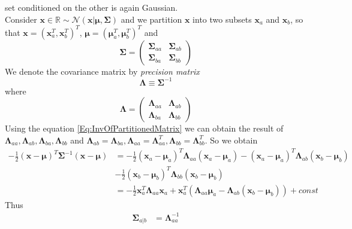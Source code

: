 \documentclass[12pt, a4paper]{article}
\newcommand{\R}{\mathbb{R}}
\begin{document}
\begin{itemize}
        set conditioned on the other is again Gaussian.\\
        Consider $\bm{x}\in\R \sim \mathcal{N}(\bm{x}|\bm{\mu},\bm{\Sigma})$ and we partition $\bm{x}$
        into two subsets $\bm{x}_a$ and $\bm{x}_b$, so that $\bm{x}=(\bm{x}_a^T, \bm{x}_b^T)^T$, 
        $\bm{\mu}=(\bm{\mu}_a^T,\bm{\mu}_b^T)^T$ and 
        \begin{equation*}
            \bm{\Sigma}=\begin{pmatrix}
                \bm{\Sigma}_{aa} & \bm{\Sigma}_{ab}\\
                \bm{\Sigma}_{ba} & \bm{\Sigma}_{bb}
            \end{pmatrix}
        \end{equation*}
        We denote the covariance matrix by \textit{precision matrix}
        \begin{equation*}
            \bm{\Lambda} \equiv\bm{\Sigma}^{-1}
        \end{equation*}
        where 
        \begin{equation*}
            \bm{\Lambda}=\begin{pmatrix}
                \bm{\Lambda}_{aa} & \bm{\Lambda}_{ab}\\
                \bm{\Lambda}_{ba} & \bm{\Lambda}_{bb}
            \end{pmatrix}
        \end{equation*}
        Using the equation \ref{Eq:InvOfPartitionedMatrix} we can obtain the result of $\bm{\Lambda}_{aa},
        \bm{\Lambda}_{ab}, \bm{\Lambda}_{ba}, \bm{\Lambda}_{bb}$ and $\bm{\Lambda}_{ab}=\bm{\Lambda}_{ba},
        \bm{\Lambda}_{aa}=\bm{\Lambda}_{aa}^T,\bm{\Lambda}_{bb}=\bm{\Lambda}_{bb}^T$.
         So we obtain
        \begin{align*}
            -\frac{1}{2}(\bm{x}-\bm{\mu})^T\bm{\Sigma}^{-1}(\bm{x}-\bm{\mu})&=-\frac{1}{2}
            (\bm{x}_a-\bm{\mu}_a)^T\bm{\Lambda}_{aa}(\bm{x}_a-\bm{\mu}_a)-
            (\bm{x}_a-\bm{\mu}_a)^T\bm{\Lambda}_{ab}(\bm{x}_b-\bm{\mu}_b)\\
            &-\frac{1}{2}(\bm{x}_b-\bm{\mu}_b)^T\bm{\Lambda}_{bb}(\bm{x}_b-\bm{\mu}_b)\\
            &=-\frac{1}{2}\bm{x}_a^T\bm{\Lambda}_{aa}\bm{x}_a+\bm{x}_a^T(\bm{\Lambda}_{aa}\bm{\mu}_a-
            \bm{\Lambda}_{ab}(\bm{x}_b-\bm{\mu}_b))+const
        \end{align*}
        Thus
        \begin{align}
            \bm{\Sigma}_{a\vert b}&=\bm{\Lambda}_{aa}^{-1}\\

\end{align}
\end{itemize}
\end{document}
